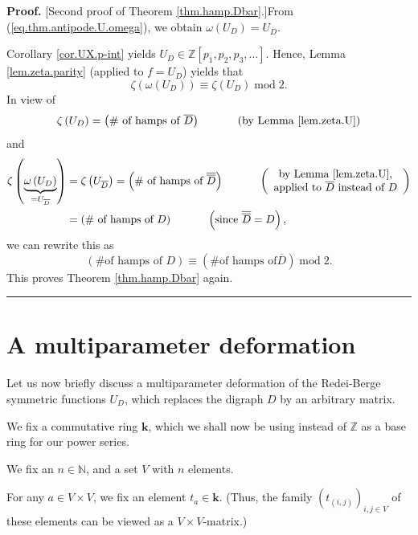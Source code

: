 \documentclass[numbers=enddot,12pt,final,onecolumn,notitlepage]{scrartcl}%
\numberwithin{exer}{section}
\theoremstyle{definition}
\newenvironment{proof}[1][Proof]{\noindent\textbf{#1.} }{\ \rule{0.5em}{0.5em}}
\begin{document}
\begin{proof}
[Second proof of Theorem \ref{thm.hamp.Dbar}.]From
(\ref{eq.thm.antipode.U.omega}), we obtain $\omega\left(  U_{D}\right)
=U_{\overline{D}}$.

Corollary \ref{cor.UX.p-int} yields $U_{D}\in\mathbb{Z}\left[  p_{1}%
,p_{2},p_{3},\ldots\right]  $. Hence, Lemma \ref{lem.zeta.parity} (applied to
$f=U_{D}$) yields that%
\[
\zeta\left(  \omega\left(  U_{D}\right)  \right)  \equiv\zeta\left(
U_{D}\right)  \operatorname{mod}2.
\]
In view of%
\[
\zeta\left(  U_{D}\right)  =\left(  \text{\# of hamps of }\overline{D}\right)
\ \ \ \ \ \ \ \ \ \ \left(  \text{by Lemma \ref{lem.zeta.U}}\right)
\]
and%
\begin{align*}
\zeta\left(  \underbrace{\omega\left(  U_{D}\right)  }_{=U_{\overline{D}}%
}\right)   &  =\zeta\left(  U_{\overline{D}}\right)  =\left(  \text{\# of
hamps of }\overline{\overline{D}}\right)  \ \ \ \ \ \ \ \ \ \ \left(
\begin{array}
[c]{c}%
\text{by Lemma \ref{lem.zeta.U},}\\
\text{applied to }\overline{D}\text{ instead of }D
\end{array}
\right) \\
&  =\left(  \text{\# of hamps of }D\right)  \ \ \ \ \ \ \ \ \ \ \left(
\text{since }\overline{\overline{D}}=D\right)  ,
\end{align*}
we can rewrite this as%
\[
\left(  \text{\# of hamps of }D\right)  \equiv\left(  \text{\# of hamps of
}\overline{D}\right)  \operatorname{mod}2.
\]
This proves Theorem \ref{thm.hamp.Dbar} again.
\end{proof}

\section{\label{sec.matrixgen}A multiparameter deformation}

Let us now briefly discuss a multiparameter deformation of the Redei-Berge
symmetric functions $U_{D}$, which replaces the digraph $D$ by an arbitrary matrix.

We fix a commutative ring $\mathbf{k}$, which we shall now be using instead of
$\mathbb{Z}$ as a base ring for our power series.

We fix an $n\in\mathbb{N}$, and a set $V$ with $n$ elements.

For any $a\in V\times V$, we fix an element $t_{a}\in\mathbf{k}$. (Thus, the
family $\left(  t_{\left(  i,j\right)  }\right)  _{i,j\in V}$ of these
elements can be viewed as a $V\times V$-matrix.)
\end{document}
